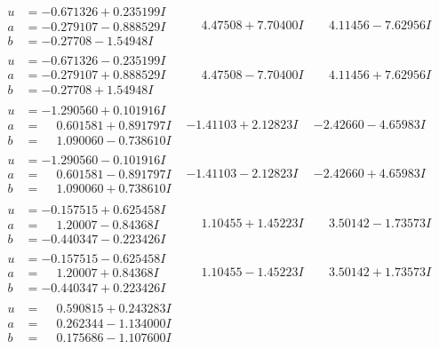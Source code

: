 \documentclass[1p]{elsarticle_modified}
\theoremstyle{definition}
\begin{document}
$$\begin{array}{c|c|c}
\begin{aligned}
u &= -0.671326 + 0.235199 I \\
a &= -0.279107 - 0.888529 I \\
b &= -0.27708 - 1.54948 I\end{aligned}
 & \phantom{-}4.47508 + 7.70400 I & \phantom{-}4.11456 - 7.62956 I \\ \hline\begin{aligned}
u &= -0.671326 - 0.235199 I \\
a &= -0.279107 + 0.888529 I \\
b &= -0.27708 + 1.54948 I\end{aligned}
 & \phantom{-}4.47508 - 7.70400 I & \phantom{-}4.11456 + 7.62956 I \\ \hline\begin{aligned}
u &= -1.290560 + 0.101916 I \\
a &= \phantom{-}0.601581 + 0.891797 I \\
b &= \phantom{-}1.090060 - 0.738610 I\end{aligned}
 & -1.41103 + 2.12823 I & -2.42660 - 4.65983 I \\ \hline\begin{aligned}
u &= -1.290560 - 0.101916 I \\
a &= \phantom{-}0.601581 - 0.891797 I \\
b &= \phantom{-}1.090060 + 0.738610 I\end{aligned}
 & -1.41103 - 2.12823 I & -2.42660 + 4.65983 I \\ \hline\begin{aligned}
u &= -0.157515 + 0.625458 I \\
a &= \phantom{-}1.20007 - 0.84368 I \\
b &= -0.440347 - 0.223426 I\end{aligned}
 & \phantom{-}1.10455 + 1.45223 I & \phantom{-}3.50142 - 1.73573 I \\ \hline\begin{aligned}
u &= -0.157515 - 0.625458 I \\
a &= \phantom{-}1.20007 + 0.84368 I \\
b &= -0.440347 + 0.223426 I\end{aligned}
 & \phantom{-}1.10455 - 1.45223 I & \phantom{-}3.50142 + 1.73573 I \\ \hline\begin{aligned}
u &= \phantom{-}0.590815 + 0.243283 I \\
a &= \phantom{-}0.262344 - 1.134000 I \\
b &= \phantom{-}0.175686 - 1.107600 I\end{aligned}

\end{array}$$
\end{document}
